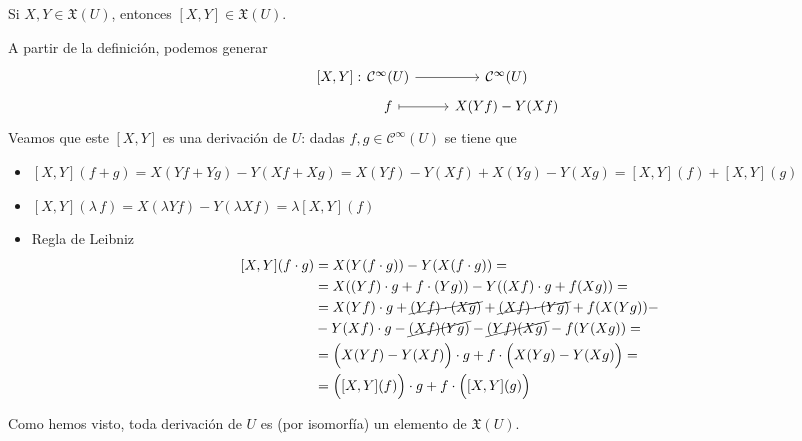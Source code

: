 \begin{prop}
Si $X,Y \in \mathfrak{X}(U)$, entonces $[X,Y]\in \mathfrak{X}(U)$.
\end{prop}
\begin{dem}
A partir de la definición, podemos generar
$$\begin{tikzcd}
\left[X,Y\right]:\hspace{-10mm} & \mathcal{C}^{\infty}(U) \rar & \mathcal{C}^{\infty}(U)\\[-5mm]
& f \arrow[mapsto]{r} & X(Yf) - Y(Xf)
\end{tikzcd}$$
Veamos que este $[X,Y]$ es una derivación de $U$: dadas $f,g\in \mathcal{C}^{\infty}(U)$ se tiene que
\begin{itemize}
    \item $[X,Y](f+g) = X(Yf + Yg) - Y(Xf + Xg) = X(Yf) - Y(Xf) + X(Yg) - Y(Xg) = [X,Y](f) + [X,Y](g)$
    \item $[X,Y](\lambda\,f) = X(\lambda Yf) - Y(\lambda Xf) = \lambda[X,Y](f)$
    \item Regla de Leibniz \[\begin{split} [X,Y](f \cdot g) & =  X(Y(f\cdot g)) - Y(X(f\cdot g))= \\ & = X((Yf)\cdot g+f \cdot (Yg)) - Y((Xf) \cdot g + f(Xg))= \\ & = X(Yf) \cdot g + \cancel{(Yf)\cdot (Xg)} + \cancel{(Xf)\cdot(Yg)} + f(X(Yg)) - \\& - Y(Xf)\cdot g - \cancel{(Xf)(Yg)} - \cancel{(Yf)(Xg)} - f(Y(Xg))= \\ & = \Big( X(Yf) - Y(Xf) \Big) \cdot g + f \cdot \Big( X(Yg) - Y(Xg)\Big) = \\ & = \Big([X,Y](f)\Big) \cdot g + f \cdot \Big([X,Y](g)\Big) \end{split}\]
\end{itemize}
Como hemos visto, toda derivación de $U$ es (por isomorfía) un elemento de $\mathfrak{X}(U)$.
\end{dem}

